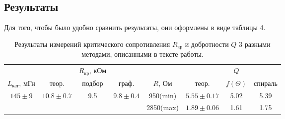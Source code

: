 \documentclass[a4paper, 14pt]{extarticle}%
\newcommand\ECaption[1]{%
     \captionsetup{font=footnotesize}%
     \caption{#1}}
\begin{document}
\subsection*{Результаты}

Для того, чтобы было удобно сравнить результаты, они оформлены в виде таблицы 4.

\begin{table}[]
\begin{center}
\begin{tabular}{|c|ccc|c|ccc}
\hline
\rowcolor[HTML]{CBCEFB} 
\cellcolor[HTML]{9698ED} &                                                         &           $R_{\text{кр}}$, кОм                                            &      & \cellcolor[HTML]{9698ED}      &                                                          &                          $Q$                          &                                                   \\ \cline{2-4} \cline{6-8} 
\cellcolor[HTML]{9698ED}$L_{\text{кат}}$, мГн   & \multicolumn{1}{c|}{теор.}                                   & \multicolumn{1}{c|}{подбор}                            &  граф.         & \cellcolor[HTML]{9698ED}$R$, Ом         &  \multicolumn{1}{c|}{теор.}                                    & \multicolumn{1}{c|}{$f(\Theta)$}                  & \multicolumn{1}{c|}{спираль}                             \\ \hline
\rowcolor[HTML]{DAE8FC} 
\cellcolor[HTML]{9698ED}$145\pm9$         & \multicolumn{1}{c|}{\cellcolor[HTML]{DAE8FC}$10.8\pm0.7$} & \multicolumn{1}{c|}{\cellcolor[HTML]{DAE8FC}9.5} & $9.8\pm0.4$ & \cellcolor[HTML]{9698ED}950(min)  & \multicolumn{1}{c|}{\cellcolor[HTML]{DAE8FC}$5.55\pm0.17$} & \multicolumn{1}{c|}{\cellcolor[HTML]{DAE8FC}5.02} & \multicolumn{1}{c|}{\cellcolor[HTML]{DAE8FC}5.39} \\ \cline{2-8} 
\cellcolor[HTML]{9698ED}                & \multicolumn{1}{c|}{}                                   & \multicolumn{1}{c|}{}                            &           & \cellcolor[HTML]{9698ED}2850(max) & \multicolumn{1}{c|}{$1.89\pm0.06$}                         & \multicolumn{1}{c|}{1.61}                         & \multicolumn{1}{c|}{1.75}                         \\ \hline
\end{tabular}
\ECaption{Результаты измерений критического сопротивления $R_{\text{кр}}$ и добротности $Q$ 3 разными методами, описанными в тексте работы.}
\end{center}
\end{table}
\end{document}

